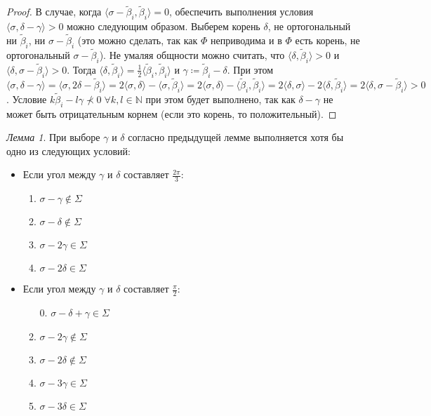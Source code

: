 \documentclass[10pt]{article}
\theoremstyle{break}
\theoremstyle{remark}
\newtheorem{lm}{Лемма}
\newcommand{\N}{\mathbb{N}}
\begin{document}
\begin{proof}
В случае, когда $\langle\sigma-\widetilde\beta_i,\widetilde\beta_i\rangle=0$, обеспечить выполнения условия $\langle\sigma,\delta-\gamma\rangle>0$ можно следующим образом. Выберем корень $\delta$, не ортогональный ни $\widetilde\beta_i$, ни $\sigma-\widetilde\beta_i$ (это можно сделать, так как $\Phi$ неприводима и в $\Phi$ есть корень, не ортогональный $\sigma-\widetilde\beta_i$). Не умаляя общности можно считать, что $\langle\delta,\widetilde\beta_i\rangle>0$ и $\langle\delta,\sigma-\widetilde\beta_i\rangle>0$. Тогда $\langle\delta,\widetilde\beta_i\rangle=\frac{1}{2}\langle\widetilde\beta_i,\widetilde\beta_i\rangle$ и $\gamma\coloneqq\widetilde\beta_i-\delta$. При этом
$\langle\sigma,\delta-\gamma\rangle =
\langle\sigma,2\delta-\widetilde\beta_i\rangle =
2\langle\sigma,\delta\rangle-\langle\sigma,\widetilde\beta_i\rangle = 
2\langle\sigma,\delta\rangle-\langle\widetilde\beta_i,\widetilde\beta_i\rangle =
2\langle\delta,\sigma\rangle-2\langle\delta,\widetilde\beta_i\rangle =
2\langle\delta,\sigma-\widetilde\beta_i\rangle > 0$.
Условие $k\widetilde\beta_i-l\gamma\nprec 0\;\forall k,l\in\N$ при этом будет выполнено, так как  $\delta-\gamma$ не может быть отрицательным корнем (если это корень, то положительный).
\end{proof}

\begin{lm}\label{highestweightvariants}
При выборе $\gamma$ и $\delta$ согласно предыдущей лемме выполняется хотя бы одно из следующих условий:
\begin{itemize}
\item Если угол между $\gamma$ и $\delta$ составляет $\frac{2\pi}{3}$:
\begin{enumerate}
\item $ \sigma - \gamma \notin \Sigma$
\item $ \sigma - \delta \notin \Sigma$
\item $ \sigma - 2\gamma \in \Sigma$
\item $ \sigma - 2\delta \in \Sigma$
\end{enumerate}
\item Если угол между $\gamma$ и $\delta$ составляет $\frac{\pi}{2}$:
\begin{enumerate}
\item[0.] $ \sigma - \delta + \gamma \in \Sigma$
\item $ \sigma - 2\gamma \notin \Sigma$
\item $ \sigma - 2\delta \notin \Sigma$
\item $ \sigma - 3\gamma \in \Sigma$
\item $ \sigma - 3\delta \in \Sigma$
\end{enumerate}
\end{itemize}
\end{lm}
\end{document}
